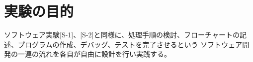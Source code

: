 

\section{実験の目的}
  ソフトウェア実験[S-1]、[S-2]と同様に、処理手順の検討、フローチャートの記述、プログラムの作成、デバッグ、テストを完了させるという
  ソフトウェア開発の一連の流れを各自が自由に設計を行い実践する。


